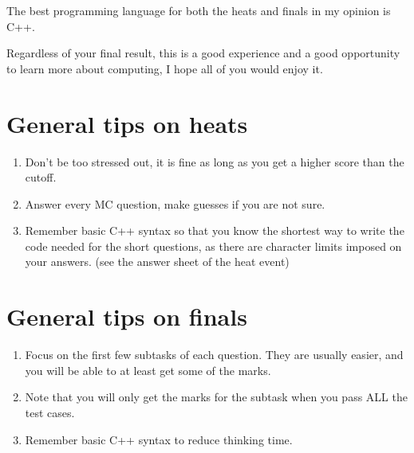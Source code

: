 The best programming language for both the heats and finals in my opinion is C++.
\vspace{6mm}

Regardless of your final result, this is a good experience and a good opportunity to learn more about computing, I hope all of you would enjoy it.

\section{General tips on heats}
\begin{enumerate}
    \item Don't be too stressed out, it is fine as long as you get a higher score than the cutoff.
    \item Answer every MC question, make guesses if you are not sure.
    \item Remember basic C++ syntax so that you know the shortest way to write the code needed for the short questions, as there are character limits imposed on your answers. (see the answer sheet of the heat event)
\end{enumerate}

\section{General tips on finals}
\begin{enumerate}
    \item Focus on the first few subtasks of each question. They are usually easier, and you will be able to at least get some of the marks.
    \item Note that you will only get the marks for the subtask when you pass ALL the test cases.
    \item Remember basic C++ syntax to reduce thinking time.
\end{enumerate}